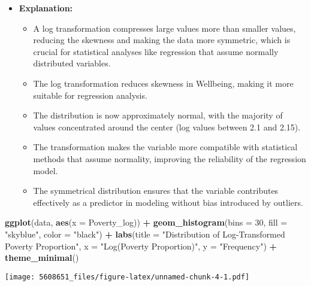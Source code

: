 \documentclass[
]{article}
\newenvironment{Shaded}{\begin{snugshade}}{\end{snugshade}}
\newcommand{\AttributeTok}[1]{\textcolor[rgb]{0.13,0.29,0.53}{#1}}
\newcommand{\DecValTok}[1]{\textcolor[rgb]{0.00,0.00,0.81}{#1}}
\newcommand{\FunctionTok}[1]{\textcolor[rgb]{0.13,0.29,0.53}{\textbf{#1}}}
\newcommand{\NormalTok}[1]{#1}
\newcommand{\SpecialCharTok}[1]{\textcolor[rgb]{0.81,0.36,0.00}{\textbf{#1}}}
\newcommand{\StringTok}[1]{\textcolor[rgb]{0.31,0.60,0.02}{#1}}
\providecommand{\tightlist}{%
  \setlength{\itemsep}{0pt}\setlength{\parskip}{0pt}}
\begin{document}
\begin{itemize}
\tightlist
\item
  \textbf{Explanation:}

  \begin{itemize}
  \tightlist
  \item
    A log transformation compresses large values more than smaller
    values, reducing the skewness and making the data more symmetric,
    which is crucial for statistical analyses like regression that
    assume normally distributed variables.
  \item
    The log transformation reduces skewness in Wellbeing, making it more
    suitable for regression analysis.
  \item
    The distribution is now approximately normal, with the majority of
    values concentrated around the center (log values between 2.1 and
    2.15).
  \item
    The transformation makes the variable more compatible with
    statistical methods that assume normality, improving the reliability
    of the regression model.
  \item
    The symmetrical distribution ensures that the variable contributes
    effectively as a predictor in modeling without bias introduced by
    outliers.
  \end{itemize}
\end{itemize}

\begin{Shaded}
\begin{Highlighting}[]
\FunctionTok{ggplot}\NormalTok{(data, }\FunctionTok{aes}\NormalTok{(}\AttributeTok{x =}\NormalTok{ Poverty\_log)) }\SpecialCharTok{+}
  \FunctionTok{geom\_histogram}\NormalTok{(}\AttributeTok{bins =} \DecValTok{30}\NormalTok{, }\AttributeTok{fill =} \StringTok{"skyblue"}\NormalTok{, }\AttributeTok{color =} \StringTok{"black"}\NormalTok{) }\SpecialCharTok{+}
  \FunctionTok{labs}\NormalTok{(}\AttributeTok{title =} \StringTok{"Distribution of Log{-}Transformed Poverty Proportion"}\NormalTok{, }\AttributeTok{x =} \StringTok{"Log(Poverty Proportion)"}\NormalTok{, }\AttributeTok{y =} \StringTok{"Frequency"}\NormalTok{) }\SpecialCharTok{+}
  \FunctionTok{theme\_minimal}\NormalTok{()}
\end{Highlighting}
\end{Shaded}

\texttt{[image: 5608651\_files/figure-latex/unnamed-chunk-4-1.pdf]}
\end{document}
